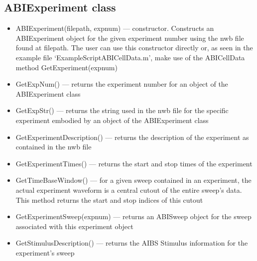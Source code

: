 \documentclass{article}
\begin{document}
\subsection{ABIExperiment class}
\begin{itemize}
	\item ABIExperiment(filepath, expnum) --- constructor.  Constructs an ABIExperiment object for the given experiment number using the nwb file found at filepath. The user can use this constructor directly or, as seen in the example file `ExampleScriptABICellData.m', make use of the ABICellData method GetExperiment(expnum)
	\item GetExpNum() --- returns the experiment number for an object of the ABIExperiment class
	\item GetExpStr() --- returns the string used in the nwb file for the specific experiment embodied by an object of the ABIExperiment class
	\item GetExperimentDescription() --- returns the description of the experiment as contained in the nwb file
	\item GetExperimentTimes() --- returns the start and stop times of the experiment
	\item GetTimeBaseWindow() --- for a given sweep contained in an experiment, the actual experiment waveform is a central cutout of the entire sweep's data. This method returns the start and stop indices of this cutout
	\item GetExperimentSweep(expnum)  --- returns an ABISweep object for the sweep associated with this experiment object
	\item GetStimulusDescription() --- returns the AIBS Stimulus information for the experiment's sweep
\end{itemize}
\end{document}
